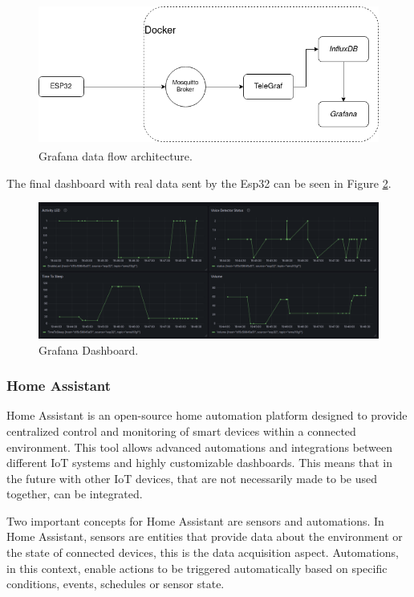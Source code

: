 \begin{figure}[H]
    \centering
    \includegraphics*[scale = 0.5]{Images/GrafanaFlowchart.png}
    \caption{Grafana data flow architecture\textsuperscript{\cite{Coelhomatias_2024}}.}
    \label{fig:GrafanaComArch}
\end{figure}

The final dashboard with real data sent by the Esp32 can be seen in Figure \ref{fig:GrafanaDashboard}.

\begin{figure}[H]
    \centering
    \includegraphics*[scale = 0.3]{Images/GrafanaDashboard.png}
    \caption{Grafana Dashboard.}
    \label{fig:GrafanaDashboard}
\end{figure}

\subsubsection{Home Assistant}

Home Assistant is an open-source home automation platform designed to provide centralized control and monitoring of smart devices within a connected environment. This tool allows advanced automations and integrations between different IoT systems and highly customizable dashboards. This means that in the future with other IoT devices, that are not necessarily made to be used together, can be integrated. 

Two important concepts for Home Assistant are sensors and automations. In Home Assistant, sensors are entities that provide data about the environment or the state of connected devices, this is the data acquisition aspect. Automations, in this context, enable actions to be triggered automatically based on specific conditions, events, schedules or sensor state.

